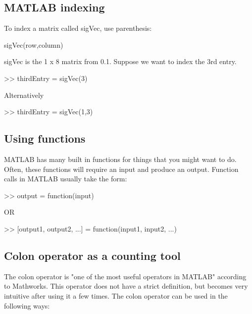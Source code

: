 \documentclass[11pt]{article}
\begin{document}
\subsection{MATLAB indexing}
To index a matrix called sigVec, use parenthesis:

\begin{center}
sigVec(row,column)

\end{center}

\vspace{5mm}

sigVec is the 1 x 8 matrix from 0.1. Suppose we want to index the 3rd entry.
\begin{center}
{>> thirdEntry = sigVec(3)}

\end{center}

Alternatively
\begin{center}
{>> thirdEntry = sigVec(1,3)}

\end{center}

\subsection{Using functions}
MATLAB has many built in functions for things that you might want to do. Often, these functions will require an input and produce an output. Function calls in MATLAB usually take the form:\newline

\begin{center}

>> output = function(input)

\end{center}

\begin{center}

OR

\end{center}

\begin{center}

>> [output1, output2, ...] = function(input1, input2, ...)

\end{center}

\subsection{Colon operator as a counting tool}
The colon operator is "one of the most useful operators in MATLAB" according to Mathworks. This operator does not have a strict definition, but becomes very intuitive after using it a few times. The colon operator can be used in the following ways:\newline
\end{document}
